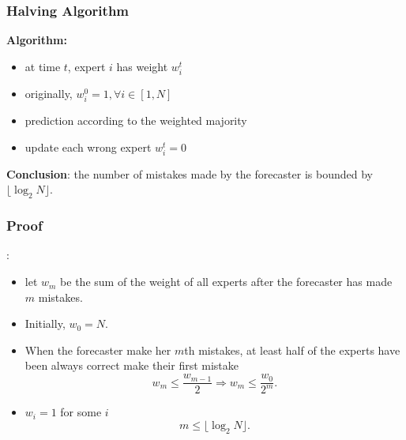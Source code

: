 \documentclass{beamer}
\begin{document}
\begin{frame}
\frametitle{Halving Algorithm}
{\bf Algorithm:}
\begin{itemize}
\item at time $t$, expert $i$ has weight $w_i^t$
\pause
\item originally, $w_i^0 = 1, \forall i\in[1,N]$
\pause
\item prediction according to the weighted majority 
\pause
\item update each wrong expert   $w_i^t = 0$
\pause
\end{itemize}
{\bf Conclusion}: the number of mistakes made by the forecaster is bounded by {\color{red}$\lfloor\log_2 N\rfloor$}.
\end{frame}

\begin{frame}
\frametitle{Proof}:
\begin{itemize}
\item let $w_m$ be the sum of the weight of all experts after the forecaster has made $m$ mistakes.
\pause
\item Initially, $w_0 = N.$
\pause
\item When the forecaster make her $m$th mistakes, at least half of the experts have been always correct make their first mistake
\begin{equation*}
w_m \le \frac{w_{m-1}}{2}\Longrightarrow w_m\le \frac{w_0}{2^m}.
\end{equation*} 
\pause
\item $w_i =1$  for some $i$
\begin{equation*}
m\le \lfloor\log_2 N\rfloor.
\end{equation*}
\end{itemize}


\end{frame}
\end{document}
